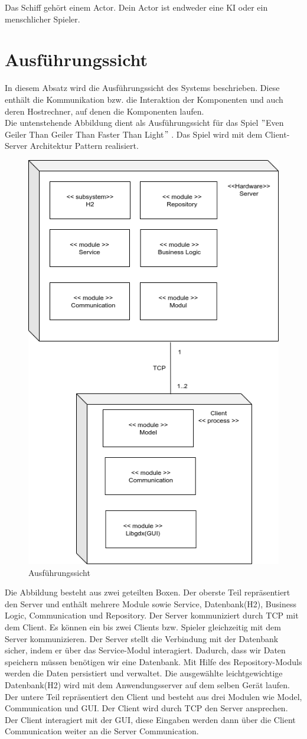 \documentclass[fontsize=12pt,paper=a4,twoside]{scrartcl}
\begin{document}
Das Schiff gehört einem Actor. Dein Actor ist endweder eine KI oder ein menschlicher Spieler.

\section{Ausführungssicht} \label{sec:ausfuehrung}



In diesem Absatz wird die Ausführungssicht des Systems beschrieben. Diese enthält die Kommunikation bzw. die Interaktion der Komponenten und auch deren Hostrechner, auf denen die Komponenten laufen. \\Die untenstehende Abbildung dient als Ausführungssicht für das Spiel $ " $Even Geiler Than Geiler Than Faster Than Light$ "$ . Das Spiel wird mit dem Client-Server Architektur Pattern realisiert.\\
\begin{figure}[htp]
	\centering
	\includegraphics[width=0.5\linewidth]{pics/Ausfuehrungsicht_Diagram.png}
	\caption{Ausführungssicht}
	\label{fig2}
	
\end{figure}
\newpage
Die Abbildung besteht aus zwei geteilten Boxen. Der oberste Teil repräsentiert den Server und enthält mehrere Module sowie Service, Datenbank(H2), Business Logic, Communication und Repository. Der Server kommuniziert durch TCP mit dem Client. Es können ein bis zwei Clients bzw. Spieler gleichzeitig mit dem Server kommunizieren. Der Server stellt die Verbindung mit der Datenbank sicher, indem er über das Service-Modul interagiert. Dadurch, dass wir Daten speichern müssen benötigen wir eine Datenbank. Mit Hilfe des Repository-Moduls werden die Daten persistiert und verwaltet. Die ausgewählte leichtgewichtige Datenbank(H2) wird mit dem Anwendungsserver auf dem selben Gerät laufen. 
\\
Der untere Teil repräsentiert den Client und besteht aus drei Modulen wie Model, Communication und GUI. Der Client wird durch TCP den Server ansprechen. Der Client interagiert mit der GUI, diese Eingaben werden dann über die Client Communication weiter an die Server Communication.
\end{document}
